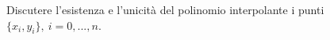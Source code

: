 Discutere l'esistenza e l'unicit\`{a} del polinomio interpolante 
i punti $\{ x_i, y_i\},\ i=0,...,n$.
